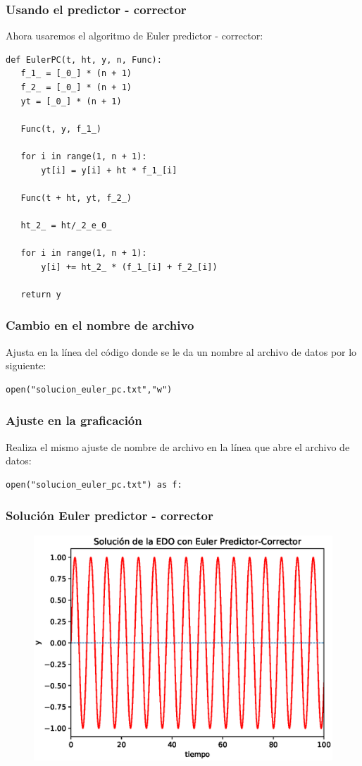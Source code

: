 \begin{frame}
\frametitle{Usando el predictor - corrector}
Ahora usaremos el algoritmo de Euler predictor - corrector:
\begin{lstlisting}[caption=Método predictor - corrector, style=FormattedNumber, basicstyle=\linespread{1.1}\ttfamily=\small, columns=fullflexible]
def EulerPC(t, ht, y, n, Func):
   f_1_ = [_0_] * (n + 1)
   f_2_ = [_0_] * (n + 1)
   yt = [_0_] * (n + 1)

   Func(t, y, f_1_)

   for i in range(1, n + 1):
       yt[i] = y[i] + ht * f_1_[i]

   Func(t + ht, yt, f_2_)

   ht_2_ = ht/_2_e_0_
   
   for i in range(1, n + 1):
       y[i] += ht_2_ * (f_1_[i] + f_2_[i])
   
   return y
\end{lstlisting}
\end{frame}
\begin{frame}[fragile]
\frametitle{Cambio en el nombre de archivo}
Ajusta en la línea del código donde se le da un nombre al archivo de datos por lo siguiente:
\begin{verbatim}
open("solucion_euler_pc.txt","w")
\end{verbatim}
\end{frame}
\begin{frame}[fragile]
\frametitle{Ajuste en la graficación}
Realiza el mismo ajuste de nombre de archivo en la línea que abre el archivo de datos:
\begin{verbatim}
open("solucion_euler_pc.txt") as f:
\end{verbatim}
\end{frame}
\begin{frame}[plain]
\frametitle{Solución Euler predictor - corrector}
\begin{figure}
	\centering
	\includegraphics[scale=0.65]{Imagenes/solucion_euler_pc_01.eps}
\end{figure}
\end{frame}
